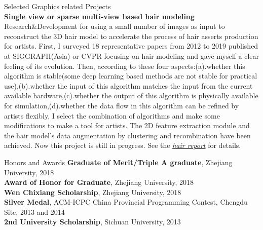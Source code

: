 \documentclass{resume} %
\makeatletter
\newcommand{\tabincell}[2]{\begin{tabular}{@{}#1@{}}#2\end{tabular}}
\makeatother
\begin{document}
\begin{rSection}{Selected Graphics related Projects}
  \\{\bf Single view or sparse multi-view based hair modeling}\\ Research\&Development for using a small number of images as input to reconstruct the 3D hair model to accelerate the process of hair asserts production for artists. First, I surveyed 18 representative papers from 2012 to 2019 published at SIGGRAPH(Asia) or CVPR focusing on hair modeling and gave myself a clear feeling of its evolution. Then, according to these four aspects:(a).whether this algorithm is stable(some deep learning based methods are not stable for practical use),(b).whether the input of this algorithm matches the input from the current available hardware,(c).whether the output of this algorithm is physically available for simulation,(d).whether the data flow in this algorithm can be refined by artists flexibly, I select the combination of algorithms and make some modifications to make a tool for artists. The 2D feature extraction module and the hair model's data augmentation by clustering and recombination have been achieved. Now this project is still in progress. See the \emph{\href{https://wtyatzoo.github.io/reports/hair.pdf}{hair report}} for details. \\
                         
\end{rSection}

\begin{rSection}{Honors and Awards}
  \textbf{Graduate of Merit/Triple A graduate}, Zhejiang University, 2018\\
  \textbf{Award of Honor for Graduate}, Zhejiang University, 2018\\
  \textbf{Wen Chixiang Scholarship}, Zhejiang University, 2018\\
  \textbf{Silver Medal}, ACM-ICPC China Provincial Programming Contest, Chengdu Site, 2013 and 2014\\
  \textbf{2nd University Scholarship}, Sichuan University, 2013
\end{rSection}

{}
\end{document}
